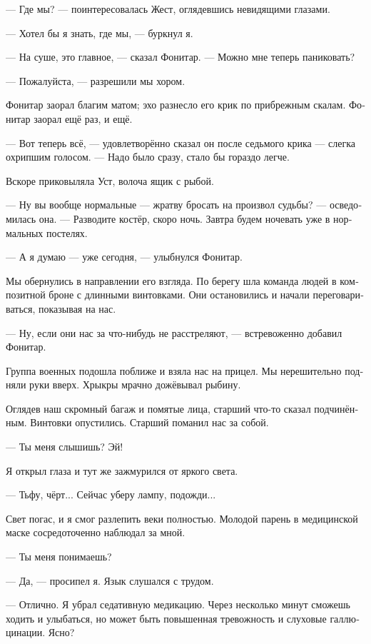 \documentclass[a4paper,10pt,fleqn]{book}\usepackage{polyglossia}\setdefaultlanguage[babelshorthands=true]{russian}\setotherlanguage{english}\defaultfontfeatures{Ligatures=TeX,Mapping=tex-text}
\newcommand{\asterism}{\vspace{1em}{\centering\Large\bfseries$\ast~\ast~\ast$\par}\vspace{1em}}
\begin{document}
--- Где мы? --- поинтересовалась Жест, оглядевшись невидящими глазами.

--- Хотел бы я знать, где мы, --- буркнул я.

--- На суше, это главное, --- сказал Фонитар.
--- Можно мне теперь паниковать?

--- Пожалуйста, --- разрешили мы хором.

Фонитар заорал благим матом;
эхо разнесло его крик по прибрежным скалам.
Фонитар заорал ещё раз, и ещё.

--- Вот теперь всё, --- удовлетворённо сказал он после седьмого крика --- слегка охрипшим голосом.
--- Надо было сразу, стало бы гораздо легче.

Вскоре приковыляла Уст, волоча ящик с рыбой.

--- Ну вы вообще нормальные --- жратву бросать на произвол судьбы? --- осведомилась она.
--- Разводите костёр, скоро ночь.
Завтра будем ночевать уже в нормальных постелях.

--- А я думаю --- уже сегодня, --- улыбнулся Фонитар.

Мы обернулись в направлении его взгляда.
По берегу шла команда людей в композитной броне с длинными винтовками.
Они остановились и начали переговариваться, показывая на нас.

--- Ну, если они нас за что-нибудь не расстреляют, --- встревоженно добавил Фонитар.

Группа военных подошла поближе и взяла нас на прицел.
Мы нерешительно подняли руки вверх.
Хрыкры мрачно дожёвывал рыбину.

Оглядев наш скромный багаж и помятые лица, старший что-то сказал подчинённым.
Винтовки опустились.
Старший поманил нас за собой.

\asterism

--- Ты меня слышишь?
Эй!

Я открыл глаза и тут же зажмурился от яркого света.

--- Тьфу, чёрт...
Сейчас уберу лампу, подожди...

Свет погас, и я смог разлепить веки полностью.
Молодой парень в медицинской маске сосредоточенно наблюдал за мной.

--- Ты меня понимаешь?

--- Да, --- просипел я.
Язык слушался с трудом.

--- Отлично.
Я убрал седативную медикацию.
Через несколько минут сможешь ходить и улыбаться, но может быть повышенная тревожность и слуховые галлюцинации.
Ясно?
\end{document}
